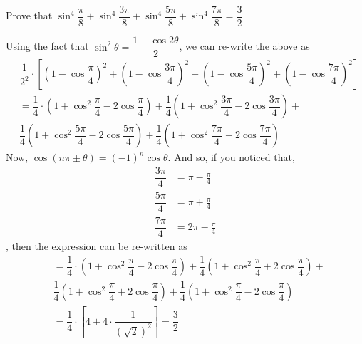 
\question[4] Prove that $\sin^4\dfrac{\pi}{8} + \sin^4\dfrac{3\pi}{8} + \sin^4\dfrac{5\pi}{8} + \sin^4\dfrac{7\pi}{8} = \dfrac{3}{2}$


\ifprintanswers
\fi 

\begin{solution}[\fullpage]
    Using the fact that $\sin^2\theta = \dfrac{1-\cos 2\theta}{2}$,  we can re-write the above as
    \begin{align}
       &\dfrac{1}{2^2}\cdot\left[\left( 1-\cos\dfrac{\pi}{4}\right)^2 + 
       \left( 1-\cos\dfrac{3\pi}{4}\right)^2
       + \left( 1-\cos\dfrac{5\pi}{4}\right)^2 + 
       \left( 1-\cos\dfrac{7\pi}{4}\right)^2\right] \\
       &= \dfrac{1}{4}\cdot\left( 1 + \cos^2\dfrac{\pi}{4} - 2\cos\dfrac{\pi}{4}\right) +
          \dfrac{1}{4}\left( 1 + \cos^2\dfrac{3\pi}{4} - 2\cos\dfrac{3\pi}{4}\right) + \nonumber \\
       & \dfrac{1}{4}\left( 1 + \cos^2\dfrac{5\pi}{4} - 2\cos\dfrac{5\pi}{4}\right) + 
          \dfrac{1}{4}\left( 1 + \cos^2\dfrac{7\pi}{4} - 2\cos\dfrac{7\pi}{4}\right) 
    \end{align}
    Now, $\cos(n\pi \pm \theta) = (-1)^{n}\cos\theta$. And so, if you noticed that,
    \begin{align}
    	\dfrac{3\pi}{4} &= \pi - \frac{\pi}{4} \\
    	\dfrac{5\pi}{4} &= \pi + \frac{\pi}{4} \\
    	\dfrac{7\pi}{4} &= 2\pi - \frac{\pi}{4}
    \end{align}
    , then the expression can be re-written as 
    \begin{align}
       &= \dfrac{1}{4}\cdot\left( 1 + \cos^2\dfrac{\pi}{4} - 2\cos\dfrac{\pi}{4}\right) +
          \dfrac{1}{4}\left( 1 + \cos^2\dfrac{\pi}{4} + 2\cos\dfrac{\pi}{4}\right) + \nonumber \\
       & \dfrac{1}{4}\left( 1 + \cos^2\dfrac{\pi}{4} + 2\cos\dfrac{\pi}{4}\right) + 
          \dfrac{1}{4}\left( 1 + \cos^2\dfrac{\pi}{4} - 2\cos\dfrac{\pi}{4}\right) \\
       &= \dfrac{1}{4}\cdot\left[ 4 + 4\cdot\dfrac{1}{(\sqrt{2})^2}\right] = \dfrac{3}{2} 
    \end{align}
\end{solution}
